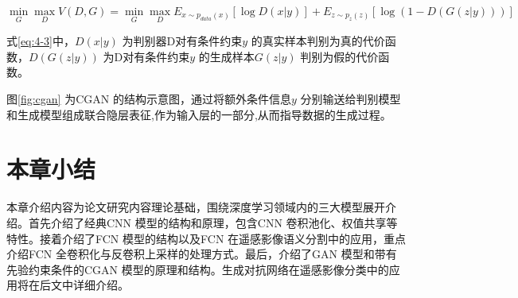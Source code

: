 \begin{equation}
  \label{eq:4-3}
  \mathop{\min}_{G} \mathop{\max}_{D} V(D,G) = \mathop{\min}_{G} \mathop{\max}_{D} E_{x \sim p_{data}(x)} [\log D(x|y)] + E_{z \sim p_{z}(z)}[ \log (1-D(G(z|y)))]
\end{equation}

式\ref{eq:4-3}中，$D(x|y)$ 为判别器D对有条件约束$y$ 的真实样本判别为真的代价函数，$D(G(z|y))$ 为D对有条件约束$y$ 的生成样本$G(z|y)$ 判别为假的代价函数。

图\ref{fig:cgan} 为CGAN 的结构示意图，通过将额外条件信息$y$ 分别输送给判别模型和生成模型组成联合隐层表征,作为输入层的一部分,从而指导数据的生成过程。

\section{本章小结}
\label{sec:chap02-4}

本章介绍内容为论文研究内容理论基础，围绕深度学习领域内的三大模型展开介绍。首先介绍了经典CNN 模型的结构和原理，包含CNN 卷积池化、权值共享等特性。接着介绍了FCN 模型的结构以及FCN 在遥感影像语义分割中的应用，重点介绍FCN 全卷积化与反卷积上采样的处理方式。最后，介绍了GAN 模型和带有先验约束条件的CGAN 模型的原理和结构。生成对抗网络在遥感影像分类中的应用将在后文中详细介绍。